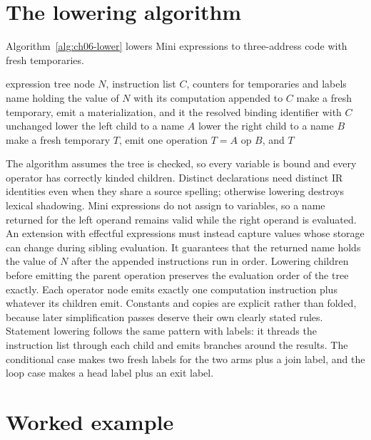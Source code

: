 \section{The lowering algorithm}
\label{sec:ch06-lowering-algorithm}

Algorithm~\ref{alg:ch06-lower} lowers Mini expressions to three-address code with fresh temporaries.
\begin{algorithm}
\caption{Lowering Mini expressions to three-address code.}
\label{alg:ch06-lower}
\begin{pseudocode}
\Require expression tree node $N$, instruction list $C$, counters for temporaries and labels
\Ensure name holding the value of $N$ with its computation appended to $C$
\State make a fresh temporary, emit a materialization, and \Return it
\State \Return the resolved binding identifier with $C$ unchanged
\State lower the left child to a name $A$
\State lower the right child to a name $B$
\State make a fresh temporary $T$, emit one operation $T = A$ op $B$, and \Return $T$
\EndIf
\EndFunction
\end{pseudocode}
\end{algorithm}
The algorithm assumes the tree is checked, so every variable is bound and every operator has correctly kinded children.
Distinct declarations need distinct IR identities even when they share a source spelling; otherwise lowering destroys lexical shadowing.
Mini expressions do not assign to variables, so a name returned for the left operand remains valid while the right operand is evaluated.
An extension with effectful expressions must instead capture values whose storage can change during sibling evaluation.
It guarantees that the returned name holds the value of $N$ after the appended instructions run in order.
Lowering children before emitting the parent operation preserves the evaluation order of the tree exactly.
Each operator node emits exactly one computation instruction plus whatever its children emit.
Constants and copies are explicit rather than folded, because later simplification passes deserve their own clearly stated rules.
Statement lowering follows the same pattern with labels: it threads the instruction list through each child and emits branches around the results.
The conditional case makes two fresh labels for the two arms plus a join label, and the loop case makes a head label plus an exit label.

\section{Worked example}
\label{sec:ch06-worked-example}

